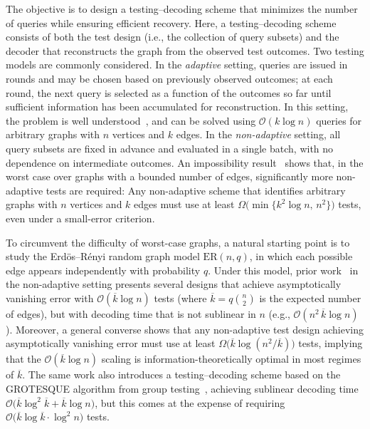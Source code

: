\documentclass[journal]{IEEEtran}
\theoremstyle{definition}
\theoremstyle{definition}
\newcommand{\ER}{\mathrm{ER}}
\newcommand{\kb}{\overline{k}}
\newcommand{\bigO}{\mathcal{O}}
\begin{document}
The objective is to design a testing–decoding scheme that minimizes the number of queries while ensuring efficient recovery. Here, a testing–decoding scheme consists of both the test design (i.e., the collection of query subsets) and the decoder that reconstructs the graph from the observed test outcomes.
Two testing models are commonly considered. In the \emph{adaptive} setting, queries are issued in rounds and may be chosen based on previously observed outcomes; at each round, the next query is selected as a function of the outcomes so far until sufficient information has been accumulated for reconstruction. In this setting, the problem is well understood~\cite{johann2002group}, and can be solved using $\bigO(k \log n)$ queries for arbitrary graphs with \(n\) vertices and \(k\) edges. In the \emph{non\mbox{-}adaptive} setting, all query subsets are fixed in advance and evaluated in a single batch, with no dependence on intermediate outcomes. An impossibility result~\cite{abasi2019learning} shows that, in the worst case over graphs with a bounded number of edges, significantly more non\mbox{-}adaptive tests are required:  Any non\mbox{-}adaptive scheme that identifies arbitrary graphs with \(n\) vertices and \(k\) edges must use at least \(\Omega \big(\min\{k^2\log n,\,n^2\}\big)\) tests, even under a small-error criterion.

To circumvent the difficulty of worst-case graphs, a natural starting point is to study the Erd\"os–R\'enyi random graph model \(\ER(n,q)\), in which each possible edge appears independently with probability \(q\). Under this model, prior work~\cite{li2019learning} in the non\mbox{-}adaptive setting presents several designs that achieve asymptotically vanishing error with \(\bigO(\kb\log n)\) tests (where \(\kb = q \binom{n}{2}\) is the expected number of edges), but with decoding time that is not sublinear in \(n\) (e.g., \(\bigO(n^{2}\,\kb\log n)\)). Moreover, a general converse shows that any non\mbox{-}adaptive test design achieving asymptotically vanishing error must use at least \(\Omega \big(\kb\log (n^{2}/\kb)\big)\) tests, implying that the \(\bigO(\kb\log n)\) scaling is information-theoretically optimal in most regimes of \(\kb\). The same work also introduces a testing–decoding scheme based on the GROTESQUE algorithm from group testing~\cite{cai2017efficient}, achieving sublinear decoding time \(\bigO \big(\kb\log^{2}\kb+\kb\log n\big)\), but this comes at the expense of requiring \(\bigO \big(\kb\log \kb \cdot \log^{2} n\big)\) tests.
\end{document}
